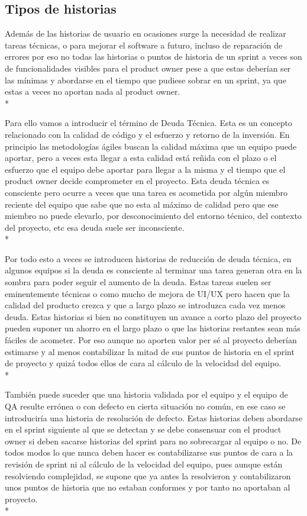 \documentclass[../pfc.tex]{subfiles}
\begin{document}
	\subsection{Tipos de historias}
	
	Además de las historias de usuario en ocasiones surge la necesidad de realizar tareas técnicas, o para mejorar el software a futuro, incluso de reparación de errores por eso no todas las historias o puntos de historia de un sprint a veces son de funcionalidades visibles para el product owner pese a que estas deberían ser las mínimas y abordarse en el tiempo que pudiese sobrar en un sprint, ya que estas a veces no aportan nada al product owner.\\*
	
	Para ello vamos a introducir el término de Deuda Técnica. Esta es un concepto relacionado con la calidad de código y el esfuerzo y retorno de la inversión. En principio las metodologías ágiles buscan la calidad máxima que un equipo puede aportar, pero a veces esta llegar a esta calidad está reñida con el plazo o el esfuerzo que el equipo debe aportar para llegar a la misma y el tiempo que el product owner decide comprometer en el proyecto. Esta deuda técnica es consciente pero ocurre a veces que una tarea es acometida por algún miembro reciente del equipo que sabe que no esta al máximo de calidad pero que ese miembro no puede elevarlo, por desconocimiento del entorno técnico, del contexto del proyecto, etc esa deuda suele ser inconsciente.\\*
	
	Por todo esto a veces se introducen historias de reducción de deuda técnica, en algunos equipos si la deuda es consciente al terminar una tarea generan otra en la sombra para poder seguir el aumento de la deuda. Estas tareas suelen ser eminentemente técnicas o como mucho de mejora de UI/UX pero hacen que la calidad del producto crezca y que a largo plazo se introduzca cada vez menos deuda. Estas historias si bien no constituyen un avance a corto plazo del proyecto pueden suponer un ahorro en el largo plazo o que las historias restantes sean más fáciles de acometer. Por eso aunque no aporten valor per sé al proyecto deberían estimarse y al menos contabilizar la mitad de sus puntos de historia en el sprint de proyecto y quizá todos ellos de cara al cálculo de la velocidad del equipo.\\*
	
	También puede suceder que una historia validada por el equipo y el equipo de QA resulte errónea o con defecto en cierta situación no común, en ese caso se introduciría una historia de resolución de defecto. Estas historias deben abordarse en el sprint siguiente al que se detectan y se debe consensuar con el product owner si deben sacarse historias del sprint para no sobrecargar al equipo o no. De todos modos lo que nunca deben hacer es contabilizarse sus puntos de cara a la revisión de sprint ni al cálculo de la velocidad del equipo, pues aunque están resolviendo complejidad, se supone que ya antes la resolvieron y contabilizaron unos puntos de historia que no estaban conformes y por tanto no aportaban al proyecto. \\*
		
\end{document}
